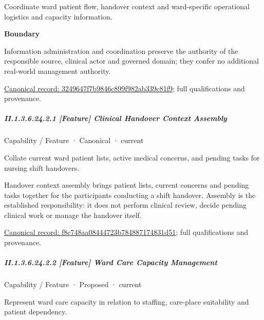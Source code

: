 Coordinate ward patient flow, handover context and ward-specific operational logistics and capacity information.



\textbf{Boundary}



Information administration and coordination preserve the authority of the responsible source, clinical actor and governed domain; they confer no additional real-world management authority.


{\footnotesize \href{../../../../continuum/strategy/capability/3249647f7b9846c899f982ab339c81f9.md}{Canonical record: 3249647f7b9846c899f982ab339c81f9}; full qualifications and provenance.}\par
\subparagraph*{II.1.3.6.24.2.1 [Feature] Clinical Handover Context Assembly}
\label{navigation:II.1.3.6.24.2.1}

\label{element:f8c748aa08444723b784887174831d51}
{\small Capability / Feature · Canonical · current}\par

Collate current ward patient lists, active medical concerns, and pending tasks for nursing shift handovers.



Handover context assembly brings patient lists, current concerns and pending tasks together for the participants conducting a shift handover. Assembly is the established responsibility: it does not perform clinical review, decide pending clinical work or manage the handover itself.


{\footnotesize \href{../../../../continuum/strategy/capability/feature/f8c748aa08444723b784887174831d51.md}{Canonical record: f8c748aa08444723b784887174831d51}; full qualifications and provenance.}\par
\subparagraph*{II.1.3.6.24.2.2 [Feature] Ward Care Capacity Management}
\label{navigation:II.1.3.6.24.2.2}

\label{element:0d45b0afc0584afba4bd0414f5f10e37}
{\small Capability / Feature · Proposed · current}\par

Represent ward care capacity in relation to staffing, care-place suitability and patient dependency.



